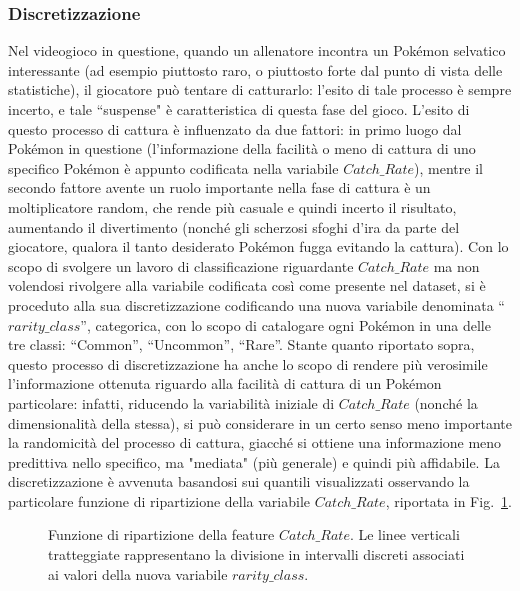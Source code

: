 \documentclass[fleqn,10pt]{SelfArx} %
\begin{document}
\subsubsection{Discretizzazione}
Nel videogioco in questione, quando un allenatore incontra un Pokémon selvatico interessante (ad esempio piuttosto raro, o piuttosto forte dal punto di vista delle statistiche), il giocatore può tentare di catturarlo: l'esito di tale processo è sempre incerto, e tale ``suspense" è caratteristica di questa fase del gioco. L'esito di questo processo di cattura è influenzato da due fattori: in primo luogo dal Pokémon in questione (l'informazione della facilità o meno di cattura di uno specifico Pokémon è appunto codificata nella variabile $Catch\_Rate$), mentre il secondo fattore avente un ruolo importante nella fase di cattura è un moltiplicatore random, che rende più casuale e quindi incerto il risultato, aumentando il divertimento (nonché gli scherzosi sfoghi d'ira da parte del giocatore, qualora il tanto desiderato Pokémon fugga evitando la cattura). 
Con lo scopo di svolgere un lavoro di classificazione riguardante $Catch\_Rate$ ma non volendosi rivolgere alla variabile codificata così come presente nel dataset, si è proceduto alla sua discretizzazione codificando una nuova variabile denominata “$rarity\_class$”, categorica, con lo scopo di catalogare ogni Pokémon in una delle tre classi: “Common”, “Uncommon”, “Rare”.
Stante quanto riportato sopra, questo processo di discretizzazione ha anche lo scopo di rendere più verosimile l'informazione ottenuta riguardo alla facilità di cattura di un Pokémon particolare: infatti, riducendo la variabilità iniziale di $Catch\_Rate$ (nonché la dimensionalità della stessa), si può considerare in un certo senso meno importante la randomicità del processo di cattura, giacché si ottiene una informazione meno predittiva nello specifico, ma "mediata" (più generale) e quindi più affidabile.
La discretizzazione è avvenuta basandosi sui quantili visualizzati osservando la particolare funzione di ripartizione della variabile $Catch\_Rate$, riportata in Fig.~\ref{ripartiz:fig}.
\begin{figure}
\caption{\label{ripartiz:fig} Funzione di ripartizione della feature $Catch\_Rate$. Le linee verticali tratteggiate rappresentano la divisione in intervalli discreti associati ai valori della nuova variabile $rarity\_class$.}
\end{figure}
\end{document}
